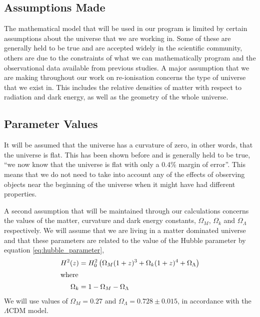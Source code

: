 
\subsection{Assumptions Made} %
	\label{sub:assumptions_made}
    The mathematical model that will be used in our program is limited by certain assumptions about the universe that we are working in. Some of these are generally held to be true and are accepted widely in the scientific community, others are due to the constraints of what we can mathematically program and the observational data available from previous studies. A major assumption that we are making throughout our work on re-ionisation concerns the type of universe that we exist in. This includes the relative densities of matter with respect to radiation and dark energy, as well as the geometry of the whole universe. 


\subsection{Parameter Values} %
    \label{sub:parameter_values}

    It will be assumed that the universe has a curvature of zero, in other words, that the universe is flat. This has been shown before and is generally held to be true, ``we now know that the universe is flat with only a 0.4\% margin of error''\cite{nasa_uni_shape}. This means that we do not need to take into account any of the effects of observing objects near the beginning of the universe when it might have had different properties.

    A second assumption that will be maintained through our calculations concerns the values of the matter, curvature and dark energy constants, $\Omega_M$, $\Omega_k$ and $\Omega_{\Lambda}$ respectively. We will assume that we are living in a matter dominated universe and that these parameters are related to the value of the Hubble parameter by equation \ref{eq:hubble_parameter}\cite{hubble_parameter_astro_journal},
    \begin{align}
        H^2(z) &= H_0^2\left( \Omega_M(1+z)^3 + \Omega_k(1+z)^4 + \Omega_{\Lambda} \right) \label{eq:hubble_parameter}\\
        \intertext{where}
        \Omega_k &= 1- \Omega_M - \Omega_{\Lambda}
    \end{align}
    We will use values of $\Omega_M=0.27$ and $\Omega_{\Lambda}=0.728\pm0.015$, in accordance with the $\Lambda$CDM model\cite{WMAP_Observations_Cosmological_Interpretation}.


